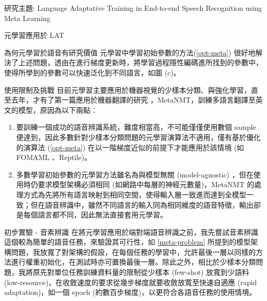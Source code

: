 \documentclass[12pt]{extarticle}
\begin{document}
\begin{section}{研究主題: Language Adaptative Training in End-to-end Speech Recognition using Meta Learning}
\begin{subsection}{元學習應用於 LAT}
\begin{subsubsection}{為何元學習於語音有研究價值}
      元學習中學習初始參數的方法(\ref{opt-meta}) 很好地解決了上述問題，透由在進行梯度更新時，將學習過程隱性編碼進所找到的參數中，使得所學到的參數可以快速泛化到不同語言，如圖 (c)。
    \end{subsubsection}
    \begin{subsubsection}{使用限制及挑戰} \label{meta-problem}
      目前元學習主要應用於機器視覺的少樣本分類、與強化學習，直至去年，才有了第一篇應用於機器翻譯的研究 \cite{gu2018meta}，MetaNMT，訓練多語言翻譯至英文的模型，原因為以下兩點︰
      \begin{enumerate}[itemsep=-1mm]
        \item 要訓練一個成功的語音辨識系統，難度相當高，不可能僅僅使用數個 sample 便達到，因此多數針對少樣本分類問題的元學習演算法不適用，僅有基於優化的演算法 (\ref{opt-meta}) 在以一階梯度近似的前提下才能應用於該情境 (如 FOMAML \cite{finn2017model}、Reptile\cite{nichol2018first})。
        \item 多數學習初始參數的元學習方法雖名為與模型無關 (model-agnostic) ，但在使用時仍要求模型架構必須相同 (如網路中每層的神經元數量)，MetaNMT 的處理方式為先將所有語言映射到相同空間，使得輸入層一致進而達到全模型一致；但在語音辨識中，雖然不同語言的輸入同為相同維度的語音特徵，輸出卻是每個語言都不同，因此無法直接套用元學習。
      \end{enumerate}
    \end{subsubsection}
    \begin{subsubsection}{初步實驗 - 音素辨識}
      在將元學習應用於端對端語音辨識之前，我先嘗試音素辨識這個較為簡單的語音任務，來驗證其可行性，如 \ref{meta-problem} 所提到的模型架構問題，我放寬了對架構的假設，在每個任務的學習中，允許最後一層以同樣的方法進行權重初始化，在測試時亦可置換最後一層。除此之外，相比於少樣本分類問題，我將原先對單位任務訓練資料量的限制從少樣本 (few-shot) 放寬到少語料 (low-resource)，在收斂速度的要求從幾步梯度就要收斂放寬至快速自適應 (rapid adaptation)，如一個 epoch (約數百步梯度)，以更符合各語音任務的使用情境。
    \end{subsubsection}
  \end{subsection}
\end{section}
\end{document}
